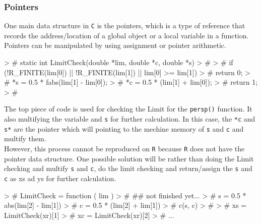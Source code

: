\documentclass[paper=a4, fontsize=11pt]{report}
\begin{document}
\subsubsection{Pointers}
One main data structure in \texttt{C} is the pointers, which is a type of reference that records the address/location of a global object or a local variable in a function. Pointers can be manipulated by using assignment or pointer arithmetic.
\begin{Schunk}
\begin{Sinput}
> # static int LimitCheck(double *lim, double *c, double *s)
> # {
> #     if (!R_FINITE(lim[0]) || !R_FINITE(lim[1]) || lim[0] >= lim[1])
> # 	return 0;
> #     *s = 0.5 * fabs(lim[1] - lim[0]);
> #     *c = 0.5 * (lim[1] + lim[0]);
> #     return 1;
> # }
\end{Sinput}
\end{Schunk}
The top piece of code is used for checking the Limit for the \texttt{persp()} function. It also multifying the variable  and \texttt{s} for further calculation. In this case, the \texttt{*c} and \texttt{s*} are the pointer which will pointing to the mechine memory of \texttt{s} and \texttt{c} and multify them.\\

However, this process cannot be reproduced on \texttt{R} because \texttt{R} does not have the pointer data structure. One possible solution will be rather than doing the Limit checking and multify \texttt{s} and \texttt{c}, do the limit checking and return/assign the \texttt{s} and \texttt{c} as xs ad ys for further calculation.
\begin{Schunk}
\begin{Sinput}
> # LimitCheck = function ( lim ) {
> #     ## not finished yet...
> #     s = 0.5 * abs(lim[2] - lim[1])
> #     c = 0.5 * (lim[2] + lim[1])
> #     c(s, c)
> # }
> # xs = LimitCheck(xr)[1]
> # xc = LimitCheck(xr)[2]
> # ...
\end{Sinput}
\end{Schunk}
\end{document}
